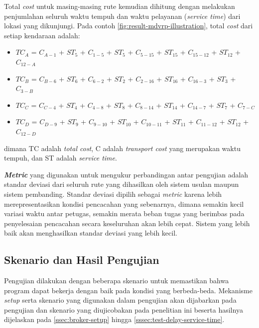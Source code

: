 Total \textit{cost} untuk masing-masing rute kemudian dihitung dengan melakukan penjumlahan seluruh waktu tempuh dan waktu pelayanan (\textit{service time}) dari lokasi yang dikunjungi. Pada contoh \autoref{fig:result-mdvrp-illustration}, total \textit{cost} dari setiap kendaraan adalah:

\begin{itemize}
	\item $TC_A$ = $C_{A-1}$ + $ST_5$ + $C_{1-5}$ + $ST_5$ + $C_{5-15}$ + $ST_15$ + $C_{15-12}$ + $ST_12$ + $C_{12-A}$
	\item $TC_B$ = $C_{B-6}$ + $ST_6$ + $C_{6-2}$ + $ST_2$ + $C_{2-16}$ + $ST_16$ + $C_{16-3}$ + $ST_3$ + $C_{3-B}$
	\item $TC_C$ = $C_{C-4}$ + $ST_4$ + $C_{4-8}$ + $ST_8$ + $C_{8-14}$ + $ST_14$ + $C_{14-7}$ + $ST_7$ + $C_{7-C}$
	\item $TC_D$ = $C_{D-9}$ + $ST_9$ + $C_{9-10}$ + $ST_10$ + $C_{10-11}$ + $ST_11$ + $C_{11-12}$ + $ST_12$ + $C_{12-D}$
\end{itemize}
dimana TC adalah \textit{total cost}, C adalah \textit{transport cost} yang merupakan waktu tempuh, dan ST adalah \textit{service time}.


\textbf{\textit{Metric}} yang digunakan untuk mengukur perbandingan antar pengujian adalah standar deviasi dari seluruh rute yang dihasilkan oleh sistem usulan maupun sistem pembanding. Standar deviasi dipilih sebagai \textit{metric} karena lebih merepresentasikan kondisi pencacahan yang sebenarnya, dimana semakin kecil variasi waktu antar petugas, semakin merata beban tugas yang berimbas pada penyelesaian pencacahan secara keseluruhan akan lebih cepat. Sistem yang lebih baik akan menghasilkan standar deviasi yang lebih kecil.


\subsection{Skenario dan Hasil Pengujian}
Pengujian dilakukan dengan beberapa skenario untuk memastikan bahwa program dapat bekerja dengan baik pada kondisi yang berbeda-beda. Mekanisme \textit{setup} serta skenario yang digunakan dalam pengujian akan dijabarkan pada pengujian dan skenario yang diujicobakan pada penelitian ini beserta hasilnya dijelaskan pada \autoref{ssec:broker-setup} hingga \autoref{sssec:test-delay-service-time}.


